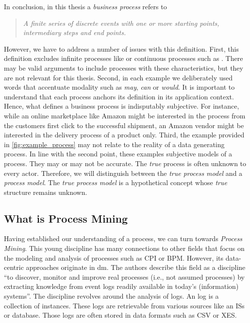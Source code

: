 \documentclass[12pt,a4paper]{report}
\begin{document}
\noindent In conclusion, in this thesis a \emph{business process} refers to \begin{quote}
    \emph{A finite series of discrete events with one or more starting points, intermediary steps and end points.}
\end{quote}
However, we have to address a number of issues with this definition.
First, this definition excludes infinite processes like  or continuous processes such as . There may be valid arguments to include processes with these characteristics, but they are not relevant for this thesis.
Second, in each example we deliberately used words that accentuate modality such as \emph{may}, \emph{can} or \emph{would}. It is important to understand that each process anchors its definition in its application context. Hence, what defines a business process is indisputably subjective. For instance, while an online marketplace like Amazon might be interested in the process from the customers first click to the successful shipment, an Amazon vendor might be interested in the delivery process of a product only.
Third, the example provided in \autoref{fig:example_process} may not relate to the reality of a data generating process. In line with the second point, these examples subjective models of a process. They may or may not be accurate. The \emph{true} process is often unknown to every actor. Therefore, we will distinguish between the \emph{true process model} and a \emph{process model}. The \emph{true process model} is a hypothetical concept whose \emph{true} structure remains unknown.

\subsection{What is Process Mining}
Having established our understanding of a process, we can turn towards \emph{Process Mining}. This young discipline has many connections to other fields that focus on the modeling and analysis of processes such as \gls{CPI} or \gls{BPM}. However, its data-centric approaches originate in \gls{dm}.
The authors \citeauthor{vanderaalst_ProcessMiningManifesto_2012} describe this field as a discipline \enquote{to discover, monitor and improve real processes (i.e., not assumed processes) by extracting knowledge from event logs readily available in today's (information) systems}\autocite{vanderaalst_ProcessMiningManifesto_2012}. The discipline revolves around the analysis of \glspl{log}.
An \gls{log} is a collection of \glspl{instance}. These logs are retrievable from various sources like an \glspl{IS} or database. Those logs are often stored in data formats such as \gls{CSV} or \gls{XES}.
\end{document}
